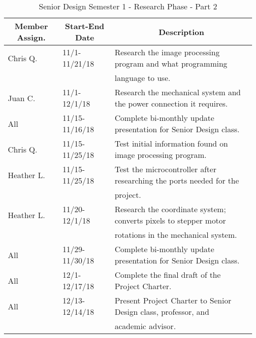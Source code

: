 \begin{table} [H]	
\normalsize
\centering
\begin{tabular}{|l|l|l|}
\hline
\multicolumn{1}{|c|}{\textbf{Member Assign.}} & \multicolumn{1}{|c|}{\textbf{Start-End Date}} & \multicolumn{1}{|c|}{\textbf{Description}} \\
\hline
		Chris Q. & 11/1-11/21/18 & 
		Research the image processing program and what programming \\
		& & language to use.\\
		\hline
		Juan C. & 11/1-12/1/18 &
		Research the mechanical system and the power connection it requires. \\
		\hline
		
		All & 11/15-11/16/18 & Complete bi-monthly update presentation for Senior Design class.\\
		\hline
		Chris Q. & 11/15-11/25/18 & Test initial information found on image processing program.\\
		\hline
		Heather L. & 11/15-11/25/18 & Test the microcontroller after researching the ports needed for the \\
		& & project.\\
		\hline
		Heather L. & 11/20-12/1/18 & Research the coordinate system; converts pixels to stepper motor \\
		& & rotations in the mechanical system.\\
		\hline
		All & 11/29-11/30/18 & 
		Complete bi-monthly update presentation for Senior Design class.\\
		\hline
		All & 12/1-12/17/18 & 
		Complete the final draft of the Project Charter.\\
		\hline
		All & 12/13-12/14/18 & 
		Present Project Charter to Senior Design class, professor, and \\
		& & academic advisor.\\
		\hline
\end{tabular} 
\caption{Senior Design Semester 1 - Research Phase - Part 2}
\label{table:3}
\end{table}


